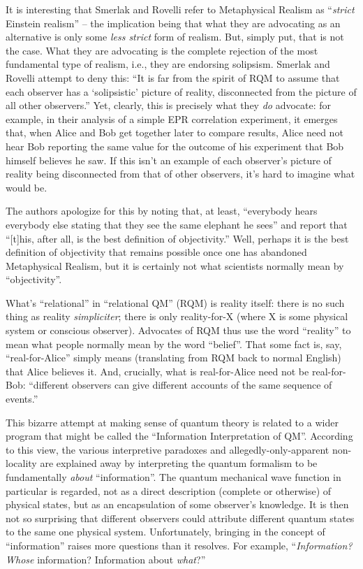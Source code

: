 \documentclass[12pt]{article}
\begin{document}
It is interesting that 
Smerlak and Rovelli refer to Metaphysical Realism as
``\emph{strict} Einstein realism'' -- the implication being that
what they are advocating as an alternative is only some \emph{less
strict} form of realism.  But, simply put, that is not the case.
What they are advocating is the complete rejection of the most
fundamental type of realism, i.e., they are endorsing solipsism.
Smerlak and Rovelli attempt to deny this:  
``It is far from the spirit of
RQM to assume that each observer has a `solipsistic' picture of
reality, disconnected from the picture of all other observers.''
Yet, clearly, this is precisely what they \emph{do} advocate:  for
example, in their analysis of a simple EPR correlation experiment,
it emerges that, when Alice and Bob get together later to compare
results, Alice need not hear Bob reporting the same value for the outcome
of his experiment that Bob himself believes he saw.  If this isn't an
example of each observer's picture of reality being disconnected from
that of other observers, it's hard to imagine what would be.

The authors
apologize for this by noting that, at least, ``everybody hears
everybody else stating that they see the same elephant he sees'' and
report that ``[t]his, after all, is the best definition of
objectivity.''   Well, perhaps it is the best definition of
objectivity that remains possible once one has abandoned
Metaphysical Realism, but it is certainly not what scientists
normally mean by ``objectivity''.

What's ``relational'' in ``relational QM'' (RQM) is reality 
itself:  there is no such thing as reality \emph{simpliciter}; there
is only reality-for-X (where X is some physical system or
conscious observer).  Advocates of RQM thus use the word ``reality''
to mean what people normally mean by the word ``belief''.  That
some fact is, say, ``real-for-Alice'' simply means (translating from
RQM back to normal English) that Alice believes it.  And,
crucially, what is real-for-Alice need not be real-for-Bob:
``different observers can give different accounts of the same sequence
of events.'' \cite{rovelli}  

This bizarre attempt at making sense of quantum theory is related to a
wider program that might be called the ``Information Interpretation of
QM''.  According to this view, the various interpretive paradoxes and
allegedly-only-apparent non-locality are explained away by
interpreting the quantum formalism to be fundamentally \emph{about}
``information''.  The quantum mechanical wave function in particular
is regarded, not as a direct description (complete or otherwise) of
physical states, but as an encapsulation of some observer's
knowledge.  It is then not so surprising that different observers
could attribute different quantum states to the same one physical
system.  Unfortunately, bringing in the concept of ``information''
raises more questions than it resolves.  For example, 
``\emph{Information?}  \emph{Whose} information?
Information about \emph{what}?'' \cite[page 215]{bell}
\end{document}
